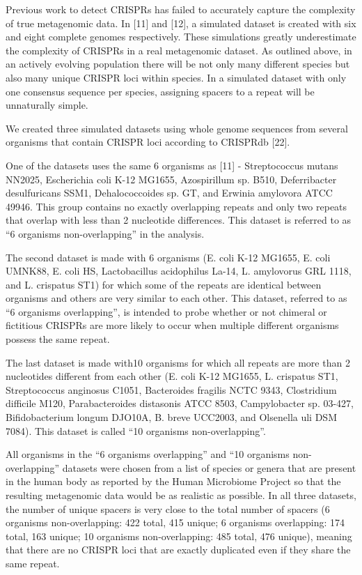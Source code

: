 \documentclass{bmcart}
\begin{document}
	Previous work to detect CRISPRs has failed to accurately capture the complexity of true metagenomic data. In  [11] and  [12], a simulated dataset is created with six and eight complete genomes respectively. These simulations greatly underestimate the complexity of CRISPRs in a real metagenomic dataset. As outlined above, in an actively evolving population there will be not only many different species but also many unique CRISPR loci within species. In a simulated dataset with only one consensus sequence per species, assigning spacers to a repeat will be unnaturally simple.
	
	We created three simulated datasets using whole genome sequences from several organisms that contain CRISPR loci according to CRISPRdb [22]. 
	
	One of the datasets uses the same 6 organisms as [11] - Streptococcus mutans NN2025, Escherichia coli K-12 MG1655, Azospirillum sp. B510, Deferribacter desulfuricans SSM1, Dehalococcoides sp. GT, and Erwinia amylovora ATCC 49946. This group contains no exactly overlapping repeats and only two repeats that overlap with less than 2 nucleotide differences. This dataset is referred to as “6 organisms non-overlapping” in the analysis. 
	
	The second dataset is made with 6 organisms (E. coli K-12 MG1655, E. coli UMNK88, E. coli HS, Lactobacillus acidophilus La-14, L. amylovorus GRL 1118, and L. crispatus ST1) for which some of the repeats are identical between organisms and others are very similar to each other. This dataset, referred to as “6 organisms overlapping”, is intended to probe whether or not chimeral or fictitious CRISPRs are more likely to occur when multiple different organisms possess the same repeat. 
	
	The last dataset is made with10 organisms for which all repeats are more than 2 nucleotides different from each other (E. coli K-12 MG1655, L. crispatus ST1, Streptococcus anginosus C1051, Bacteroides fragilis NCTC 9343, Clostridium difficile M120, Parabacteroides distasonis ATCC 8503, Campylobacter sp. 03-427, Bifidobacterium longum DJO10A, B. breve UCC2003, and Olsenella uli DSM 7084). This dataset is called “10 organisms non-overlapping”.
	
	All organisms in the “6 organisms overlapping” and “10 organisms non-overlapping” datasets were chosen from a list of species or genera that are present in the human body as reported by the Human Microbiome Project so that the resulting metagenomic data would be as realistic as possible. In all three datasets, the number of unique spacers is very close to the total number of spacers (6 organisms non-overlapping: 422 total, 415 unique; 6 organisms overlapping: 174 total, 163 unique; 10 organisms non-overlapping: 485 total, 476 unique), meaning that there are no CRISPR loci that are exactly duplicated even if they share the same repeat. 
\end{document}

